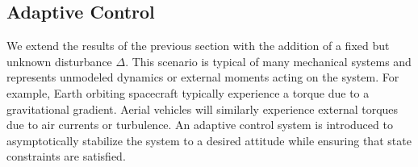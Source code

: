 \documentclass[fleqn]{IJCAS}  %
\begin{document}
\begin{multicols}{2}
\subsection{Adaptive Control}
We extend the results of the previous section with the addition of a fixed but unknown disturbance \( \Delta \).
This scenario is typical of many mechanical systems and represents unmodeled dynamics or external moments acting on the system.
For example, Earth orbiting spacecraft typically experience a torque due to a gravitational gradient.
Aerial vehicles will similarly experience external torques due to air currents or turbulence.
An adaptive control system is introduced to asymptotically stabilize the system to a desired attitude while ensuring that state constraints are satisfied. %


\end{multicols}
\end{document}
